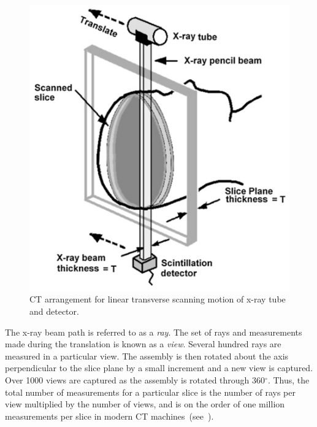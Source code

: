 \begin{figure}[ht]
\centering
		\includegraphics[scale=0.3]{media/0-imaging/ct1.png}
%
\caption{CT arrangement for linear transverse scanning motion of x-ray tube and detector. ~\cite{goldman_2007}}
\label{fig:ct1}
\end{figure}

The x-ray beam path is referred to as a \textit{ray}. The set of rays and measurements made during the translation is known as a \textit{view}. Several hundred rays are measured in a particular view. The assembly is then rotated about the axis perpendicular to the slice plane by a small increment and a new view is captured. Over 1000 views are captured as the assembly is rotated through 360$^{\circ}$. Thus, the total number of measurements for a particular slice is the number of rays per view multiplied by the number of views, and is on the order of one million measurements per slice in modern CT machines~(see~).


